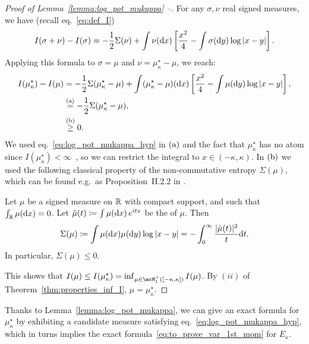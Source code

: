 \begin{proof}[Proof of Lemma~\ref{lemma:log_pot_mukappa} --]
    For any $\sigma, \nu$ real signed measures, we have (recall eq.~\eqref{eq:def_I}) 
    \begin{equation*}
        I(\sigma + \nu) - I(\sigma) = -\frac{1}{2} \Sigma(\nu) + \int \nu(\mathrm{d} x) \left[\frac{x^2}{4} - \int \sigma(\mathrm{d} y) \log |x - y|\right]. 
    \end{equation*}
    Applying this formula to $\sigma = \mu$ and $\nu = \mu_\kappa^\star - \mu$, we reach:
    \begin{align*}
        I(\mu_\kappa^\star) - I(\mu) &= -\frac{1}{2} \Sigma(\mu_\kappa^\star - \mu) + \int (\mu_\kappa^\star - \mu)(\mathrm{d} x) \left[\frac{x^2}{4} - \int \mu(\mathrm{d} y) \log |x - y|\right], \\ 
         &\overset{\mathrm{(a)}}{=} -\frac{1}{2} \Sigma(\mu_\kappa^\star - \mu), \\ 
         &\overset{\mathrm{(b)}}{\geq} 0.
    \end{align*}
    We used eq.~\eqref{eq:log_pot_mukappa_hyp} in $(\rm a)$ and the fact that $\mu_\kappa^\star$ has no atom since $I(\mu_\kappa^\star) < \infty$~\citep{arous1997large}, so we can restrict the integral 
    to $x \in (-\kappa,\kappa)$.
    In $(\rm b)$ we used the following classical property of the non-commutative entropy $\Sigma(\mu)$, 
    which can be found e.g.\ as Proposition~II.2.2 in \cite{faraut2014logarithmic}.
    \begin{lemma}\label{lemma:nonc_entropy_pos}
        Let $\mu$ be a signed measure on $\mathbb{R}$ with compact support, and such that $\int_{\mathbb{R}} \mu(\mathrm{d} x) = 0$. 
        Let $\hat{\mu}(t) \coloneqq \int \mu(\mathrm{d} x) \, e^{i t x}$ be the  of $\mu$.
        Then 
        \begin{equation*}
            \Sigma(\mu) \coloneqq \int \mu(\mathrm{d} x) \mu(\mathrm{d} y) \log |x - y| = - \int_0^\infty \frac{|\hat{\mu}(t)|^2}{t} \mathrm{d} t.
        \end{equation*}
        In particular, $\Sigma(\mu) \leq 0$.
    \end{lemma}
    \noindent
    This shows that $I(\mu) \leq I(\mu_\kappa^\star) = \inf_{\mu \in \mcM_1^+([-\kappa,\kappa])} I(\mu)$. By $(ii)$ of Theorem~\ref{thm:properties_inf_I}, $\mu = \mu_\kappa^\star$.
\end{proof}
\noindent
Thanks to Lemma~\ref{lemma:log_pot_mukappa}, we can give an exact formula for $\mu_\kappa^\star$ by exhibiting a candidate measure satisfying eq.~\eqref{eq:log_pot_mukappa_hyp}, which in turns implies the exact formula~\eqref{eq:to_prove_var_1st_mom} for $E_\kappa$.
